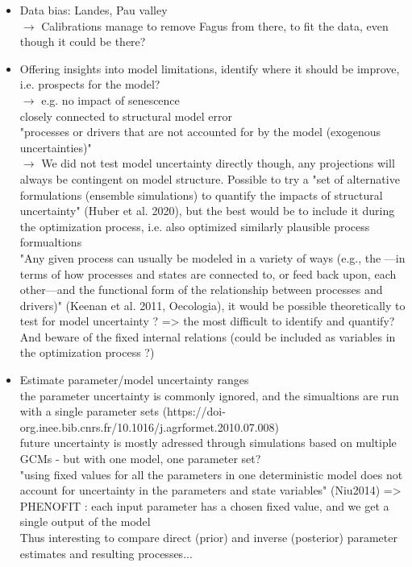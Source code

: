\documentclass[letterpaper,8pt]{extarticle}  %
\begin{document}
\begin{doublespacing}
\begin{linenumbers}
\begin{itemize}
\item Data bias: Landes, Pau valley \\
$\rightarrow$ Calibrations manage to remove Fagus from there, to fit the data, even though it could be there? \\

\item Offering insights into model limitations, identify where it should be improve, i.e. prospects for the model?\\
$\rightarrow$ e.g. no impact of senescence \\
closely connected to structural model error\\
"processes or drivers that are not accounted for by the model (exogenous uncertainties)"\\
$\rightarrow$ We did not test model uncertainty directly though, any projections will always be contingent on model structure. Possible to try a "set of alternative formulations (ensemble simulations) to quantify the impacts of structural uncertainty" (Huber et al. 2020), but the best would be to include it during the optimization process, i.e. also optimized similarly plausible process formualtions \\
"Any given process can usually be modeled in a variety of ways (e.g., the —in terms of how processes and states are connected to, or feed back upon, each other—and the functional form of the relationship between processes and drivers)" (Keenan et al. 2011, Oecologia), it would be possible theoretically to test for model uncertainty ? => the most difficult to identify and quantify? \\
And beware of the fixed internal relations (could be included as variables in the optimization process ?)

\item Estimate parameter/model uncertainty ranges  \\
the parameter uncertainty is commonly ignored, and the simualtions are run with a single parameter sets (https://doi-org.inee.bib.cnrs.fr/10.1016/j.agrformet.2010.07.008) \\
future uncertainty is mostly adressed through simulations based on multiple GCMs - but with one model, one parameter set? \\
"using fixed values for all the parameters in one deterministic model does not account for uncertainty in the parameters and state variables" (Niu2014) => PHENOFIT : each input parameter has a chosen fixed value, and we get a single output of the model \\
Thus interesting to compare direct (prior) and inverse (posterior) parameter estimates and resulting processes...\\


\end{itemize}
\end{linenumbers}
\end{doublespacing}
\end{document}
